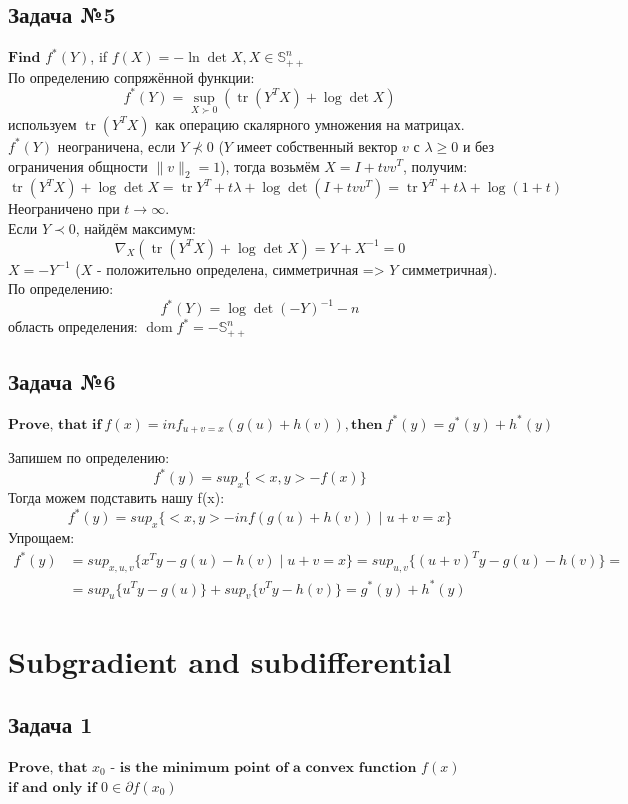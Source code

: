 \documentclass[12pt,letterpaper]{article}
\begin{document}
\subsection*{Задача №5}
$\textbf{Find}$ $f^*(Y)$, if $f(X) = - \ln \det X, X \in \mathbb{S}^n_{++}$\\
По определению сопряжённой функции: 
$$
f^{*}(Y)=\sup _{X \succ 0}(\operatorname{tr}(Y^T X)+\log \operatorname{det} X)
$$
используем $ \operatorname{tr}(Y^T X) $ как операцию скалярного умножения на матрицах. $ f^{*}(Y) $ неограничена, если $ Y \nprec 0 $ ($ Y $ имеет собственный вектор $ v $ с $ \lambda \geq  0 $ и без ограничения общности $ \|v\|_{2}=1 $), тогда возьмём $ X=I+t v v^{T} $, получим: 
$$
\operatorname{tr}(Y^T X)+\log \operatorname{det} X=\operatorname{tr} Y^T+t \lambda+\log \operatorname{det}\left(I+t v v^{T}\right)=\operatorname{tr} Y^T+t \lambda+\log (1+t)
$$
Неограничено при $ t \rightarrow \infty $.\\
Если $ Y \prec 0 $, найдём максимум:
$$
\nabla_{X}(\operatorname{tr}(Y^T X)+\log \operatorname{det} X)=Y+X^{-1}=0
$$
$ X = -Y^{-1} $ ($ X $ - положительно определена, симметричная => $ Y $ симметричная). По определению:
$$
f^{*}(Y)=\log \operatorname{det}(-Y)^{-1}-n
$$
область определения: $ \operatorname{dom} f^{*}=-\mathbb{S}_{++}^{n} $

\subsection*{Задача №6}
$\textbf{Prove, that if}\ f(x) = inf_{u+v=x}(g(u)+h(v)), \textbf{then}\ f^*(y)=g^*(y)+h^*(y)$

Запишем по определению:
$$f^*(y)= sup_x\{<x,y>-f(x)\}$$
Тогда можем подставить нашу f(x):
$$f^*(y)= sup_x\{<x,y>-inf(g(u)+h(v))\mid u+v = x\}$$
Упрощаем:
$$
\begin{aligned}
f^*(y)&= sup_{x,u,v}\{x^Ty-g(u)-h(v)\mid u+v=x\}=sup_{u,v}\{(u+v)^Ty-g(u)-h(v)\}=\\
&= sup_u\{u^Ty-g(u)\}+sup_v\{v^Ty-h(v)\}=g^*(y)+h^*(y)
\end{aligned}
$$


\newpage
\section{Subgradient and subdifferential}

\subsection*{Задача 1}
$\textbf{Prove, that}$ $x_0$ $\textbf{- is the minimum point of a convex function}$ $f(x)$ $\textbf{if and only if}$ $0 \in \partial f(x_0)$\\
\end{document}
